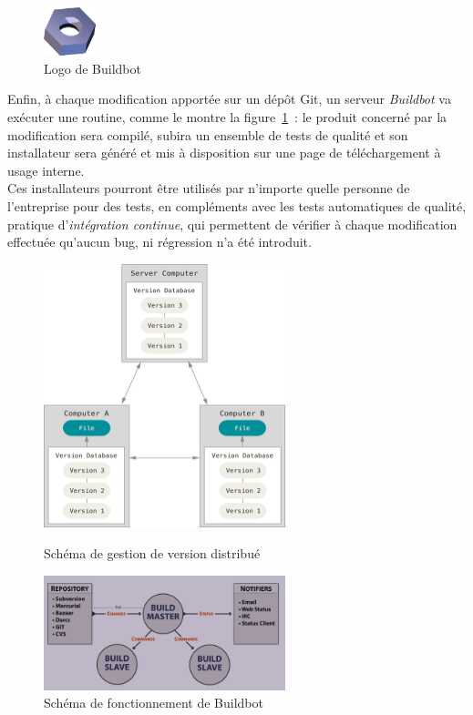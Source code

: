 \paragraph{}
\begin{figure}
  \centering
  \includegraphics[width=1.5cm]{images/buildbot-logo.png}
  \caption{Logo de Buildbot}
\end{figure}
Enfin, à chaque modification apportée sur un dépôt Git, un serveur \emph{Buildbot} va exécuter
une routine, comme le montre la figure~\ref{buildbot-diagram}~: le produit concerné par la modification sera
compilé, subira un ensemble de tests de qualité et son installateur sera généré 
et mis à disposition sur une page de téléchargement à usage interne.\\
Ces installateurs pourront être utilisés par n'importe quelle personne de l'entreprise
pour des tests, en compléments avec les tests automatiques de qualité, pratique d'\emph{intégration continue},
qui permettent de vérifier à chaque modification effectuée qu'aucun bug, ni régression n'a été 
introduit\cite{integration-continue}.
\begin{figure}
  \centering
  \begin{minipage}[b]{0.4\textwidth}
    \centering
    \includegraphics[width=7cm]{images/git-diagram.png}
    \caption{Schéma de gestion de version distribué\cite{pro-git}}
    \label{git-diagram}
  \end{minipage}%
  \hspace{0.09\textwidth}
  \begin{minipage}[b]{0.4\textwidth}
    \centering
    \includegraphics[width=7cm]{images/buildbot-diagram.png}
    \caption{Schéma de fonctionnement de Buildbot\cite{buildbot}}
    \label{buildbot-diagram}
  \end{minipage}
\end{figure}

